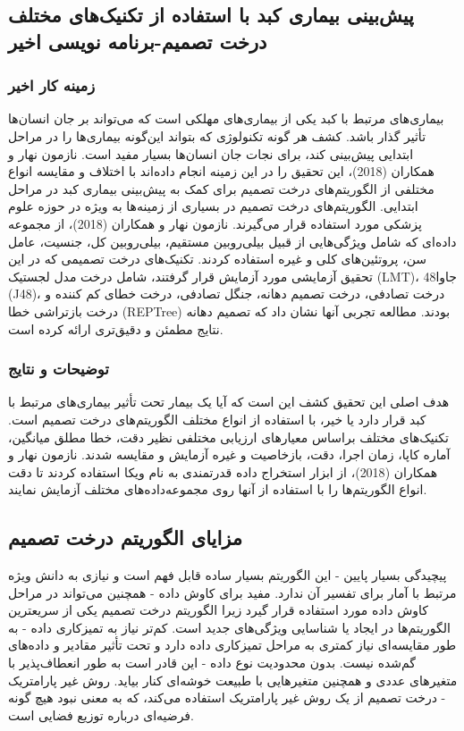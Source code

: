 \documentclass{CSICC2020}
\begin{document}
\subsection{پیش‌بینی بیماری کبد با استفاده از تکنیک‌های مختلف درخت تصمیم-برنامه نویسی اخیر }

\subsubsection{زمینه کار اخیر }
بیماری‌های مرتبط با کبد یکی از بیماری‌های مهلکی است که می‌تواند بر جان انسان‌ها تأثیر گذار باشد. کشف هر گونه تکنولوژی که بتواند این‌گونه بیماری‌ها را در مراحل ابتدایی پیش‌بینی کند، برای نجات جان انسان‌ها بسیار مفید است. نازمون نهار و همکاران (2018)، این تحقیق را در این زمینه انجام داده‌اند با اختلاف و مقایسه انواع مختلفی از الگوریتم‌های درخت تصمیم برای کمک به پیش‌بینی بیماری کبد در مراحل ابتدایی. الگوریتم‌های درخت تصمیم در بسیاری از زمینه‌ها به ویژه در حوزه علوم پزشکی مورد استفاده قرار می‌گیرند. نازمون نهار و همکاران (2018)، از مجموعه داده‌ای که شامل ویژگی‌هایی از قبیل بیلی‌روبین مستقیم، بیلی‌روبین کل، جنسیت، عامل سن، پروتئین‌های کلی و غیره استفاده کردند. تکنیک‌های درخت تصمیمی که در این تحقیق آزمایشی مورد آزمایش قرار گرفتند، شامل درخت مدل لجستیک (LMT)، جاوا48 (J48)، درخت تصادفی، درخت تصمیم دهانه، جنگل تصادفی، درخت خطای کم کننده و درخت بازتراشی خطا (REPTree) بودند. مطالعه تجربی آنها نشان داد که تصمیم دهانه نتایج مطمئن و دقیق‌تری ارائه کرده است. 
\subsubsection{توضیحات و نتایج}
هدف اصلی این تحقیق کشف این است که آیا یک بیمار تحت تأثیر بیماری‌های مرتبط با کبد قرار دارد یا خیر، با استفاده از انواع مختلف الگوریتم‌های درخت تصمیم است. تکنیک‌های مختلف براساس معیارهای ارزیابی مختلفی نظیر دقت، خطا مطلق میانگین، آماره کاپا، زمان اجرا، دقت، بازخاصیت و غیره آزمایش و مقایسه شدند. نازمون نهار و همکاران (2018)، از ابزار استخراج داده قدرتمندی به نام ویکا استفاده کردند تا دقت انواع الگوریتم‌ها را با استفاده از آنها روی مجموعه‌داده‌های مختلف آزمايش نمایند. 
\subsection{مزایای الگوریتم درخت تصمیم}
پیچیدگی بسیار پایین - این الگوریتم بسیار ساده قابل فهم است و نیازی به دانش ویژه مرتبط با آمار برای تفسیر آن ندارد. 
 مفید برای کاوش داده - همچنین می‌تواند در مراحل کاوش داده مورد استفاده قرار گیرد زیرا الگوریتم درخت تصمیم یکی از سریعترین الگوریتم‌ها در ایجاد یا شناسایی ویژگی‌های جدید است. 
 کم‌تر نیاز به تمیزکاری داده - به طور مقایسه‌ای نیاز کمتری به مراحل تمیزکاری داده دارد و تحت تأثیر مقادیر و داده‌های گم‌شده نیست. 
 بدون محدودیت نوع داده - این قادر است به طور انعطاف‌پذیر با متغیرهای عددی و همچنین متغیرهایی با طبیعت خوشه‌ای کنار بیاید. 
 روش غیر پارامتریک - درخت تصمیم از یک روش غیر پارامتریک استفاده می‌کند، که به معنی نبود هیچ گونه فرضیه‌ای درباره توزیع فضایی است. 
\end{document}
